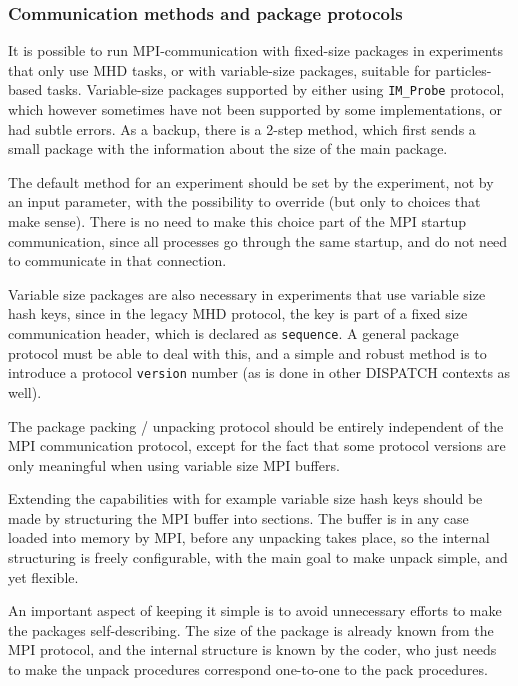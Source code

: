 \documentclass[paper=a4,fontsize=11pt]{scrartcl}
\numberwithin{equation}{section}		%
\numberwithin{figure}{section}			%
\numberwithin{table}{section}				%
\begin{document}
\subsubsection{Communication methods and package protocols}
It is possible to run MPI-communication with fixed-size packages in experiments that only use MHD tasks, or with variable-size packages, suitable for particles-based tasks.  Variable-size packages supported by either using \verb|IM_Probe| protocol, which however sometimes have not been supported by some implementations, or had subtle errors.  As a backup, there is a 2-step method, which first sends a small package with the information about the size of the main package.

The default method for an experiment should be set by the experiment, not by an input parameter, with the possibility to override (but only to choices that make sense).  There is no need to make this choice part of the MPI startup communication, since all processes go through the same startup, and do not need to communicate in that connection.

Variable size packages are also necessary in experiments that use variable size hash keys, since in the legacy MHD protocol, the key is part of a fixed size communication header, which is declared as \verb|sequence|.  A general package protocol must be able to deal with this, and a simple and robust method is to introduce a protocol \verb|version| number (as is done in other DISPATCH contexts as well).

The package packing / unpacking protocol should be entirely independent of the MPI communication protocol, except for the fact that some protocol versions are only meaningful when using variable size MPI buffers.

Extending the capabilities with for example variable size hash keys should be made by structuring the MPI buffer into sections.  The buffer is in any case loaded into memory by MPI, before any unpacking takes place, so the internal structuring is freely configurable, with the main goal to make unpack simple, and yet flexible.

An important aspect of keeping it simple is to avoid unnecessary efforts to make the packages self-describing.   The size of the package is already known from the MPI protocol, and the internal structure is known by the coder, who just needs to make the unpack procedures correspond one-to-one to the pack procedures.
\end{document}
